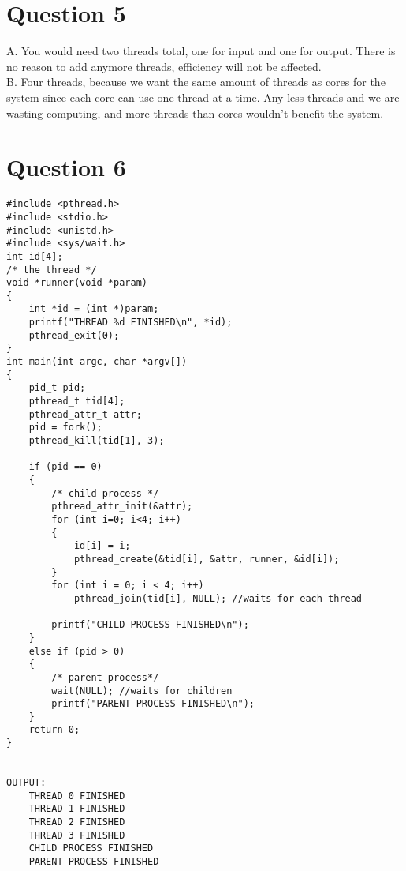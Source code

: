 \documentclass[11pt]{article}
\begin{document}
\section*{Question 5}
A. You would need two threads total, one for input and 
one for output. There is no reason to add anymore threads, 
efficiency will not be affected.\\
B. Four threads, because we want the same amount of 
threads as cores for the system since each core can 
use one thread at a time. Any less threads and we are 
wasting computing, and more threads than cores wouldn't 
benefit the system.

\newpage
\section*{Question 6}
\begin{verbatim}
#include <pthread.h>
#include <stdio.h>
#include <unistd.h>
#include <sys/wait.h>
int id[4];
/* the thread */
void *runner(void *param) 
{
    int *id = (int *)param;
    printf("THREAD %d FINISHED\n", *id);
    pthread_exit(0);
}
int main(int argc, char *argv[]) 
{
    pid_t pid;
    pthread_t tid[4];
    pthread_attr_t attr;
    pid = fork();
    pthread_kill(tid[1], 3);

    if (pid == 0) 
    {
        /* child process */
        pthread_attr_init(&attr);
        for (int i=0; i<4; i++) 
        {
            id[i] = i;
            pthread_create(&tid[i], &attr, runner, &id[i]);
        }
        for (int i = 0; i < 4; i++)
            pthread_join(tid[i], NULL); //waits for each thread

        printf("CHILD PROCESS FINISHED\n");
    } 
    else if (pid > 0) 
    {
        /* parent process*/
        wait(NULL); //waits for children
        printf("PARENT PROCESS FINISHED\n");
    }
    return 0;
}


OUTPUT:
    THREAD 0 FINISHED
    THREAD 1 FINISHED
    THREAD 2 FINISHED
    THREAD 3 FINISHED
    CHILD PROCESS FINISHED
    PARENT PROCESS FINISHED
\end{verbatim}
\end{document}
